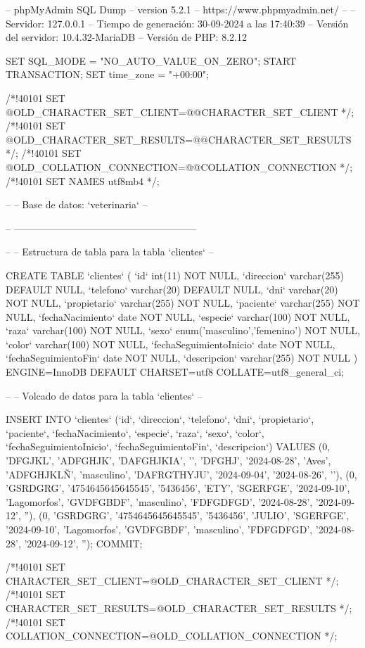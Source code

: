 -- phpMyAdmin SQL Dump
-- version 5.2.1
-- https://www.phpmyadmin.net/
--
-- Servidor: 127.0.0.1
-- Tiempo de generación: 30-09-2024 a las 17:40:39
-- Versión del servidor: 10.4.32-MariaDB
-- Versión de PHP: 8.2.12

SET SQL_MODE = "NO_AUTO_VALUE_ON_ZERO";
START TRANSACTION;
SET time_zone = "+00:00";


/*!40101 SET @OLD_CHARACTER_SET_CLIENT=@@CHARACTER_SET_CLIENT */;
/*!40101 SET @OLD_CHARACTER_SET_RESULTS=@@CHARACTER_SET_RESULTS */;
/*!40101 SET @OLD_COLLATION_CONNECTION=@@COLLATION_CONNECTION */;
/*!40101 SET NAMES utf8mb4 */;

--
-- Base de datos: `veterinaria`
--

-- --------------------------------------------------------

--
-- Estructura de tabla para la tabla `clientes`
--

CREATE TABLE `clientes` (
  `id` int(11) NOT NULL,
  `direccion` varchar(255) DEFAULT NULL,
  `telefono` varchar(20) DEFAULT NULL,
  `dni` varchar(20) NOT NULL,
  `propietario` varchar(255) NOT NULL,
  `paciente` varchar(255) NOT NULL,
  `fechaNacimiento` date NOT NULL,
  `especie` varchar(100) NOT NULL,
  `raza` varchar(100) NOT NULL,
  `sexo` enum('masculino','femenino') NOT NULL,
  `color` varchar(100) NOT NULL,
  `fechaSeguimientoInicio` date NOT NULL,
  `fechaSeguimientoFin` date NOT NULL,
  `descripcion` varchar(255) NOT NULL
) ENGINE=InnoDB DEFAULT CHARSET=utf8 COLLATE=utf8_general_ci;

--
-- Volcado de datos para la tabla `clientes`
--

INSERT INTO `clientes` (`id`, `direccion`, `telefono`, `dni`, `propietario`, `paciente`, `fechaNacimiento`, `especie`, `raza`, `sexo`, `color`, `fechaSeguimientoInicio`, `fechaSeguimientoFin`, `descripcion`) VALUES
(0, 'DFGJKL', 'ADFGHJK', 'DAFGHJKIA', '', 'DFGHJ', '2024-08-28', 'Aves', 'ADFGHJKLÑ', 'masculino', 'DAFRGTHYJU', '2024-09-04', '2024-08-26', ''),
(0, 'GSRDGRG', '4754645645645545', '5436456', 'ETY', 'SGERFGE', '2024-09-10', 'Lagomorfos', 'GVDFGBDF', 'masculino', 'FDFGDFGD', '2024-08-28', '2024-09-12', ''),
(0, 'GSRDGRG', '4754645645645545', '5436456', 'JULIO', 'SGERFGE', '2024-09-10', 'Lagomorfos', 'GVDFGBDF', 'masculino', 'FDFGDFGD', '2024-08-28', '2024-09-12', '');
COMMIT;

/*!40101 SET CHARACTER_SET_CLIENT=@OLD_CHARACTER_SET_CLIENT */;
/*!40101 SET CHARACTER_SET_RESULTS=@OLD_CHARACTER_SET_RESULTS */;
/*!40101 SET COLLATION_CONNECTION=@OLD_COLLATION_CONNECTION */;
